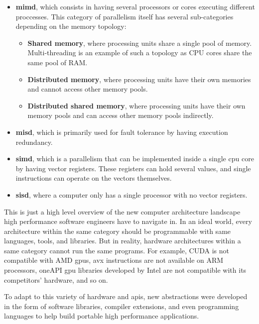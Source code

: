 \documentclass[main]{subfiles}
\begin{document}
\begin{itemize}
\item
\textbf{\gls{mimd}}, which consists in having several processors or cores
executing different proccesses. This category of parallelism itself has several
sub-categories depending on the memory topology:

  \begin{itemize}
  \item \textbf{Shared memory}, where processing units share a single
  pool of memory. Multi-threading is an example of such a topology as
  CPU cores share the same pool of RAM.
  \item \textbf{Distributed memory}, where processing units have their own
  memories and cannot access other memory pools.
  \item \textbf{Distributed shared memory}, where processing units have their
  own memory pools and can access other memory pools indirectly.
  \end{itemize}

\item
\textbf{\gls{misd}}, which is primarily used for fault tolerance by having
execution redundancy.

\item
\textbf{\gls{simd}}, which is a parallelism that can be implemented inside
a single \gls{cpu} core by having vector registers. These registers can hold
several values, and single instructions can operate on the vectors themselves.

\item
\textbf{\gls{sisd}}, where a computer only has a single processor with no
vector registers.

\end{itemize}

This is just a high level overview of the new computer architecture landscape
high performance software engineers have to navigate in.
In an ideal world, every architecture within the same category
should be programmable with same languages, tools, and libraries.
But in reality, hardware architectures within a same category
cannot run the same programs.
For example, CUDA is not compatible with AMD \glspl{gpu}, \gls{avx} instructions
are not available on ARM processors, oneAPI \gls{gpu} libraries developed by
Intel are not compatible with its competitors' hardware, and so on.

To adapt to this variety of hardware and \glspl{api}, new abstractions
were developed in the form of software libraries, compiler extensions,
and even programming languages to help build portable high performance
applications.
\end{document}

